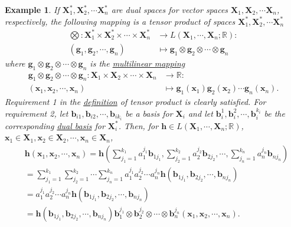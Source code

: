 \documentclass[letterpaper,12pt]{article}
\theoremstyle{plain}
\theoremstyle{plain}
\newtheorem{exmp}{Example}
\theoremstyle{definition}
\begin{document}
\begin{exmp} \label{exmpTP} If $\mathbf{X}_1^*, \mathbf{X}_2^*, \cdots \mathbf{X}_n^*$ are dual spaces for vector spaces $\mathbf{X}_1, \mathbf{X}_2, \cdots \mathbf{X}_n$, respectively, the following mapping is a tensor product of spaces $\mathbf{X}_1^*, \mathbf{X}_2^*, \cdots \mathbf{X}_n^*$
\begin{align*}
\bigotimes:\mathbf{X}_1^* \times \mathbf{X}_2^* \times \cdots \times \mathbf{X}_n^* &\rightarrow L(\mathbf{X}_1,\cdots,\mathbf{X}_n;\mathbb{R}): \\
(\mathbf{g}_1,\mathbf{g}_2,\cdots,\mathbf{g}_n) &\mapsto \mathbf{g}_1 \otimes \mathbf{g}_2 \otimes \cdots \otimes \mathbf{g}_n 
\end{align*}
where $\mathbf{g}_1 \otimes \mathbf{g}_2 \otimes \cdots \otimes \mathbf{g}_n$ is the \hyperref[defmmap]{multilinear mapping}
\begin{align*}
\mathbf{g}_1 \otimes \mathbf{g}_2 \otimes \cdots \otimes \mathbf{g}_n: \mathbf{X}_1 \times  \mathbf{X}_2 \times \cdots \times \mathbf{X}_n &\rightarrow \mathbb{R}: \\
(\mathbf{x}_1,\mathbf{x}_2,\cdots,\mathbf{x}_n) &\mapsto \mathbf{g}_1(\mathbf{x}_1)\mathbf{g}_2(\mathbf{x}_2)\cdots \mathbf{g}_n(\mathbf{x}_n).
\end{align*}
Requirement 1 in the \hyperref[deftprod]{definition} of tensor product is clearly satisfied. For requirement 2, let $\mathbf{b}_{i1},\mathbf{b}_{i2},\cdots,\mathbf{b}_{ik_i}$ be a basis for $\mathbf{X}_i$ and let $\mathbf{b}_i^1,\mathbf{b}_i^2,\cdots,\mathbf{b}_i^{k_i}$ be the corresponding \hyperref[defdbas]{dual basis} for $\mathbf{X}_i^*$. Then, for $\mathbf{h}\in L(\mathbf{X}_1,\cdots,\mathbf{X}_n;\mathbb{R})$, $\mathbf{x}_1 \in \mathbf{X}_1,\mathbf{x}_2 \in \mathbf{X}_2,\cdots,\mathbf{x}_n \in \mathbf{X}_n$,
\begin{align*}
&\mathbf{h}(\mathbf{x}_1,\mathbf{x}_2,\cdots,\mathbf{x}_n) = \mathbf{h}\left(\sum_{j_1=1}^{k_1}a_1^{j_1} \mathbf{b}_{1j_1},\sum_{j_2=1}^{k_2}a_2^{j_2} \mathbf{b}_{2j_2},\cdots,\sum_{j_n=1}^{k_n}a_n^{j_n} \mathbf{b}_{nj_n}\right) \\
&= \sum_{j_1=1}^{k_1}\sum_{j_2=1}^{k_2}\cdots \sum_{j_n=1}^{k_n} a_1^{j_1}a_2^{j_2}\cdots a_n^{j_n} \mathbf{h}(\mathbf{b}_{1j_1}, \mathbf{b}_{2j_2},\cdots, \mathbf{b}_{nj_n}) \\
&= a_1^{j_1}a_2^{j_2}\cdots a_n^{j_n} \mathbf{h}(\mathbf{b}_{1j_1}, \mathbf{b}_{2j_2},\cdots, \mathbf{b}_{nj_n})\\
&= \mathbf{h}(\mathbf{b}_{1j_1}, \mathbf{b}_{2j_2},\cdots, \mathbf{b}_{nj_n}) \mathbf{b}_1^{j_1}\otimes \mathbf{b}_2^{j_2}\otimes \cdots \otimes \mathbf{b}_n^{j_n}(\mathbf{x}_1,\mathbf{x}_2,\cdots,\mathbf{x}_n).

\end{align*}
\end{exmp}
\end{document}
